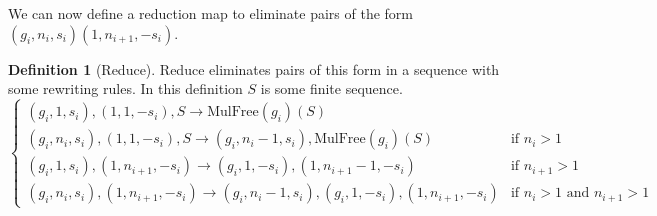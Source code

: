 \documentclass[11pt]{article} %
\theoremstyle{definition}
\theoremstyle{definition}
\theoremstyle{definition}
\theoremstyle{definition}
\theoremstyle{definition}
\newtheorem{defn}[theorem]{Definition}
\theoremstyle{definition}
\begin{document}
We can now define a reduction map to eliminate pairs of the form
 $(g_i, n_i, s_i)(1, n_{i+1}, -s_i)$.
\begin{defn}[Reduce]
  Reduce eliminates pairs of this form in a sequence with some rewriting rules.
  In this definition $S$ is some finite sequence.
  \begin{equation}
    \begin{cases}
    (g_i, 1, s_i), (1, 1, -s_i), S \to \text{MulFree}(g_i)(S) \\
    (g_i, n_i, s_i), (1, 1, -s_i), S \to (g_i, n_i - 1, s_i),
      \text{MulFree}(g_i)(S) & \text{if } n_i > 1\\
    (g_i, 1, s_i), (1, n_{i+1}, -s_i) \to
      (g_i, 1, -s_i), (1, n_{i+1} - 1, -s_i) &\text{if } n_{i+1} > 1 \\
    (g_i, n_i, s_i), (1, n_{i+1}, -s_i) \to
    (g_i, n_i - 1, s_i), (g_i, 1, -s_i), (1, n_{i + 1}, -s_i) &
      \text{if } n_i > 1\text{ and } n_{i+1} > 1
    \end{cases}
  \end{equation}

\end{defn}

\end{document}
